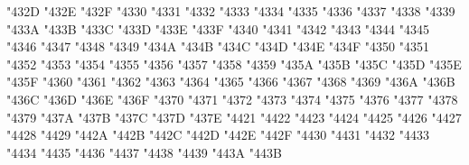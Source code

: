 {\Uchar\jis"432D %
\Uchar\jis"432E %
\Uchar\jis"432F %
\Uchar\jis"4330 %
\Uchar\jis"4331 %
\Uchar\jis"4332 %
\Uchar\jis"4333 %
\Uchar\jis"4334 %
\Uchar\jis"4335 %
\Uchar\jis"4336 %
\Uchar\jis"4337 %
\Uchar\jis"4338 %
\Uchar\jis"4339 %
\Uchar\jis"433A %
\Uchar\jis"433B %
\Uchar\jis"433C %
\Uchar\jis"433D %
\Uchar\jis"433E %
\Uchar\jis"433F %
\Uchar\jis"4340 %
\Uchar\jis"4341 %
\Uchar\jis"4342 %
\Uchar\jis"4343 %
\Uchar\jis"4344 %
\Uchar\jis"4345 %
\Uchar\jis"4346 %
\Uchar\jis"4347 %
\Uchar\jis"4348 %
\Uchar\jis"4349 %
\Uchar\jis"434A %
\Uchar\jis"434B %
\Uchar\jis"434C %
\Uchar\jis"434D %
\Uchar\jis"434E %
\Uchar\jis"434F %
\Uchar\jis"4350 %
\Uchar\jis"4351 %
\Uchar\jis"4352 %
\Uchar\jis"4353 %
\Uchar\jis"4354 %
\Uchar\jis"4355 %
\Uchar\jis"4356 %
\Uchar\jis"4357 %
\Uchar\jis"4358 %
\Uchar\jis"4359 %
\Uchar\jis"435A %
\Uchar\jis"435B %
\Uchar\jis"435C %
\Uchar\jis"435D %
\Uchar\jis"435E %
\Uchar\jis"435F %
\Uchar\jis"4360 %
\Uchar\jis"4361 %
\Uchar\jis"4362 %
\Uchar\jis"4363 %
\Uchar\jis"4364 %
\Uchar\jis"4365 %
\Uchar\jis"4366 %
\Uchar\jis"4367 %
\Uchar\jis"4368 %
\Uchar\jis"4369 %
\Uchar\jis"436A %
\Uchar\jis"436B %
\Uchar\jis"436C %
\Uchar\jis"436D %
\Uchar\jis"436E %
\Uchar\jis"436F %
\Uchar\jis"4370 %
\Uchar\jis"4371 %
\Uchar\jis"4372 %
\Uchar\jis"4373 %
\Uchar\jis"4374 %
\Uchar\jis"4375 %
\Uchar\jis"4376 %
\Uchar\jis"4377 %
\Uchar\jis"4378 %
\Uchar\jis"4379 %
\Uchar\jis"437A %
\Uchar\jis"437B %
\Uchar\jis"437C %
\Uchar\jis"437D %
\Uchar\jis"437E %
\Uchar\jis"4421 %
\Uchar\jis"4422 %
\Uchar\jis"4423 %
\Uchar\jis"4424 %
\Uchar\jis"4425 %
\Uchar\jis"4426 %
\Uchar\jis"4427 %
\Uchar\jis"4428 %
\Uchar\jis"4429 %
\Uchar\jis"442A %
\Uchar\jis"442B %
\Uchar\jis"442C %
\Uchar\jis"442D %
\Uchar\jis"442E %
\Uchar\jis"442F %
\Uchar\jis"4430 %
\Uchar\jis"4431 %
\Uchar\jis"4432 %
\Uchar\jis"4433 %
\Uchar\jis"4434 %
\Uchar\jis"4435 %
\Uchar\jis"4436 %
\Uchar\jis"4437 %
\Uchar\jis"4438 %
\Uchar\jis"4439 %
\Uchar\jis"443A %
\Uchar\jis"443B %
}
